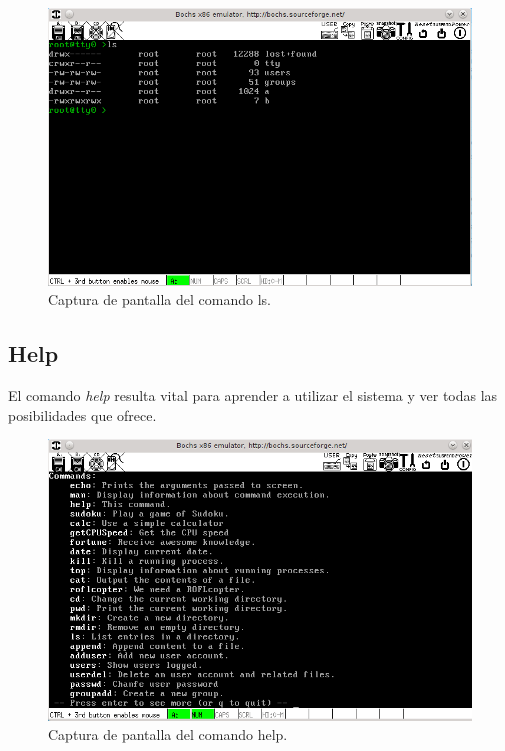 \documentclass[a4paper,10pt]{article}
\begin{document}
     \begin{figure}[H]
      \begin{center}
	\includegraphics[scale=0.65]{./images/ls.png}
	 \caption{Captura de pantalla del comando ls.}
	\end{center}
      \end{figure}

      \subsection{Help}
      El comando \textit{help} resulta vital para aprender a utilizar el sistema y ver todas las posibilidades que ofrece. 

     \begin{figure}[H]
      \begin{center}
      \includegraphics[scale=0.65]{./images/help.png}
	 \caption{Captura de pantalla del comando help.}
      \end{center}
      \end{figure}
\end{document}
